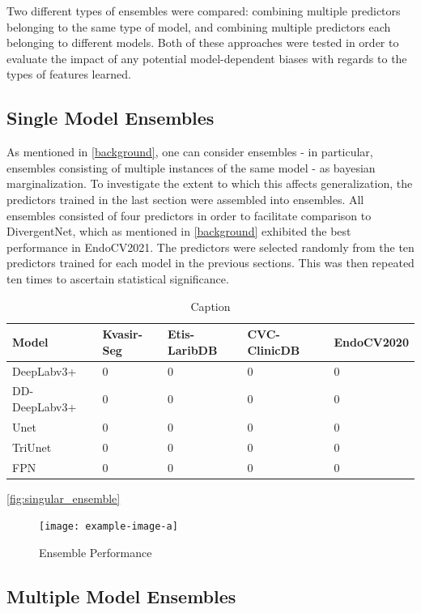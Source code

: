 Two different types of ensembles were compared: combining multiple predictors belonging to the same type of model, and combining multiple predictors each belonging to different models. Both of these approaches were tested in order to evaluate the impact of any potential model-dependent biases with regards to the types of features learned. 

\subsection{Single Model Ensembles}
As mentioned in \autoref{background}, one can consider ensembles - in particular, ensembles consisting of multiple instances of the same model - as bayesian marginalization. To investigate the extent to which this affects generalization, the predictors trained in the last section were assembled into ensembles. All ensembles consisted of four predictors in order to facilitate comparison to DivergentNet, which as mentioned in \autoref{background} exhibited the best performance in EndoCV2021. The predictors were selected randomly from the ten predictors trained for each model in the previous sections. This was then repeated ten times to ascertain statistical significance.

\begin{table}[]
    \centering
    \begin{tabularx}{\linewidth}{lXXXX}
    \toprule
         Model & Kvasir-Seg & Etis-LaribDB & CVC-ClinicDB & EndoCV2020  \\
        \midrule
         DeepLabv3+ &0&0&0&0 \\
         DD-DeepLabv3+ &0&0&0&0 \\
         Unet &0&0&0&0 \\
         TriUnet &0&0&0&0 \\
         FPN &0&0&0&0 \\
         \bottomrule
    \end{tabularx}
    \caption{Caption}
    \label{tab:ensembles}
\end{table}

\autoref{fig:singular_ensemble}
\begin{figure}
    \centering
    \texttt{[image: example-image-a]}
    \caption{Ensemble Performance }
    \label{fig:singular_ensemble}
\end{figure}



\subsection{Multiple Model Ensembles}
    